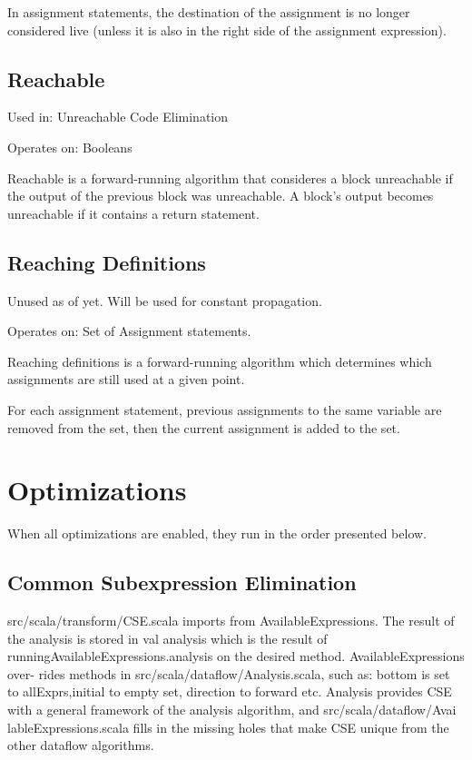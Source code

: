 \documentclass[11pt]{article}
\begin{document}
  In assignment statements, the destination of the assignment is no longer considered live (unless it is
  also in the right side of the assignment expression).
\subsection{Reachable}
\label{sec-2-3}

  Used in: Unreachable Code Elimination

  Operates on: Booleans

  Reachable is a forward-running algorithm that consideres a block unreachable if the output of the previous
  block was unreachable. A block's output becomes unreachable if it contains a return statement.
\subsection{Reaching Definitions}
\label{sec-2-4}

  Unused as of yet. Will be used for constant propagation.

  Operates on: Set of Assignment statements.

  Reaching definitions is a forward-running algorithm which determines which assignments are still used
  at a given point.

  For each assignment statement, previous assignments to the same variable are removed from the set,
  then the current assignment is added to the set.
  
\section{Optimizations}
\label{sec-3}

  When all optimizations are enabled, they run in the order presented below.
\subsection{Common Subexpression Elimination}
\label{sec-3-1}

    src/scala/transform/CSE.scala imports from AvailableExpressions. The 
result of the analysis is stored in val analysis which is the result of runningAvailableExpressions.analysis on the desired method. AvailableExpressions over-
rides methods in src/scala/dataflow/Analysis.scala, such as: bottom is set to 
allExprs,initial to empty set, direction to forward etc. Analysis provides CSE 
with a general framework of the analysis algorithm, and src/scala/dataflow/Avai
lableExpressions.scala fills in the missing holes that make CSE unique from the
other dataflow algorithms. 
\end{document}
